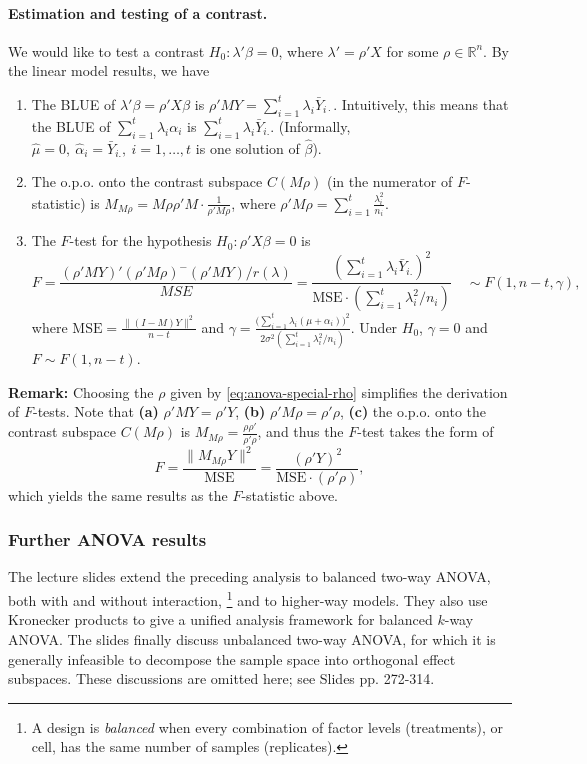 \documentclass{article}
\theoremstyle{break}
\newcommand{\R}{\ensuremath{\mathbb{R}}}
\begin{document}
\paragraph{Estimation and testing of a contrast.}\hfill\break
We would like to test a contrast $H_0: \lambda'\beta = 0$, where $\lambda' = \rho' X$ for some $\rho \in \R^n$. By the linear model results, we have
\begin{enumerate}
    \item The BLUE of $\lambda'\beta = \rho'X\beta$ is $\rho' M Y = \sum_{i=1}^t \lambda_i \bar{Y}_{i\cdot}$. Intuitively, this means that the BLUE of $\sum_{i=1}^t \lambda_i \alpha_i$ is $\sum_{i=1}^t \lambda_i \bar{Y}_{i.}$. (Informally, $\hat\mu=0,\ \hat\alpha_i = \bar{Y}_{i.},\ i=1,\ldots,t$ is one solution of $\hat\beta$).
    \item The o.p.o. onto the contrast subspace $C(M\rho)$ (in the numerator of $F$-statistic) is $M_{M\rho} = M\rho\rho'M \cdot \frac{1}{\rho' M \rho}$, where $\rho' M \rho = \sum_{i=1}^t \frac{\lambda_i^2}{n_i}$.
    \item The $F$-test for the hypothesis $H_0 : \rho' X\beta = 0$ is
    \[
    F 
    = \frac{(\rho'MY)'(\rho'M \rho)^{-} (\rho'MY) / r(\lambda)}{MSE}
    = \frac{(\sum_{i=1}^t \lambda_i \bar{Y}_{i.})^2}{\mathrm{MSE} \cdot (\sum_{i=1}^t \lambda_i^2 / n_i)}\quad\sim F(1, n-t, \gamma),
    \]
    where $\mathrm{MSE} = \frac{\|(I-M)Y\|^2}{n - t}$ and $\gamma = \frac{\big(\sum_{i=1}^t \lambda_i (\mu + \alpha_i)\big)^2}{2\sigma^2 (\sum_{i=1}^t \lambda_i^2 / n_i)}$.
    Under $H_0$, $\gamma=0$ and $F\sim F(1, n-t)$.
\end{enumerate}

\textbf{Remark:}
Choosing the $\rho$ given by \eqref{eq:anova-special-rho} simplifies the derivation of $F$-tests. Note that 
\textbf{(a)} $\rho'MY = \rho'Y$, 
\textbf{(b)} $\rho'M\rho = \rho'\rho$, 
\textbf{(c)} the o.p.o. onto the contrast subspace $C(M\rho)$ is $M_{M\rho} = \frac{\rho \rho'}{\rho'\rho}$, 
and thus the $F$-test takes the form of
\[
F = \frac{\|M_{M\rho}Y\|^2}{\mathrm{MSE}} = \frac{(\rho' Y)^2}{\mathrm{MSE} \cdot (\rho'\rho)},
\]
which yields the same results as the $F$-statistic above.




\subsubsection{Further ANOVA results}
The lecture slides extend the preceding analysis to balanced two-way ANOVA, both with and without interaction, \footnote{A design is \emph{balanced} when every combination of factor levels (treatments), or cell, has the same number of samples (replicates).} and to higher-way models. They also use Kronecker products to give a unified analysis framework for balanced $k$-way ANOVA. 
The slides finally discuss unbalanced two-way ANOVA, for which it is generally infeasible to decompose the sample space into orthogonal effect subspaces. These discussions are omitted here; see Slides pp. 272-314.
\end{document}
